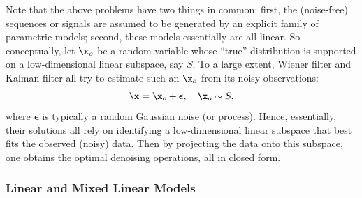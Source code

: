 \documentclass[../../book-main.tex]{subfiles}
\begin{document}
Note that the above problems have two things in common: first, the (noise-free)  sequences or signals are assumed to be generated by an explicit family of parametric models; second, these models essentially are all linear. So conceptually, let $\x_o$ be a random variable whose ``true'' distribution is supported on a low-dimensional linear subspace, say $S$. To a large extent, Wiener filter and Kalman filter all try to estimate such an $\x_o$ from its noisy observations:
\begin{equation}
    \x = \x_o + \boldsymbol{\epsilon}, \quad \x_o \sim S, 
\end{equation}
where $\boldsymbol{\epsilon}$ is typically a random Gaussian noise (or process). Hence, essentially, their solutions all rely on identifying a low-dimensional linear subspace that best fits the observed (noisy) data. Then by projecting the data onto this subspace, one obtains the optimal denoising operations, all in closed form.   


\subsubsection{Linear and Mixed Linear Models}
\label{sec:PCA-ICA}
\end{document}
